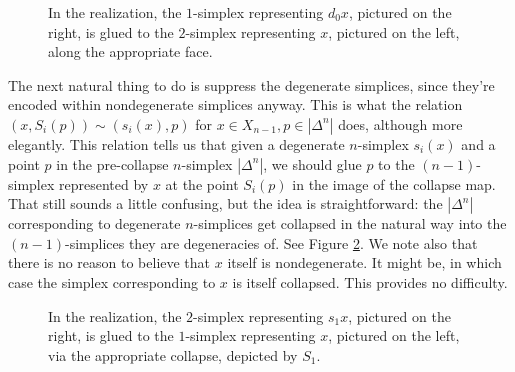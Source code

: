 \documentclass[12pt]{article}
\theoremstyle{plain}
\theoremstyle{definition}
\begin{document}
\begin{figure}[!htp]
\begin{center}
\end{center}
\caption{In the realization, the $1$-simplex representing $d_0x$, pictured on the right, is glued to the $2$-simplex representing $x$, pictured on the left, along the appropriate face.}\label{F: fig13}
\end{figure}

The next natural thing to do is suppress the degenerate simplices, since they're encoded within nondegenerate simplices anyway. This is what the relation $(x,S_i(p))\sim(s_i(x),p)$ for $x\in X_{n-1},p\in |\Delta^n|$ does, although more elegantly. This relation tells us that given a degenerate $n$-simplex $s_i(x)$ and a point $p$ in the pre-collapse $n$-simplex $|\Delta^n|$, we should glue $p$ to the $(n-1)$-simplex represented by $x$ at the point $S_i(p)$ in the image of the collapse map. That still sounds a little confusing, but the idea is straightforward: the $|\Delta^n|$ corresponding to degenerate $n$-simplices get collapsed in the natural way into the $(n-1)$-simplices they are degeneracies of. See Figure \ref{F: fig14}. We note also that there is no reason to believe that $x$ itself is nondegenerate. It might be, in which case the simplex corresponding to $x$ is itself collapsed. This provides no difficulty.



\begin{figure}[!htp]
\begin{center}
\end{center}
\caption{In the realization, the $2$-simplex representing $s_1x$, pictured on the right, is glued to the $1$-simplex representing $x$, pictured on the left, via the appropriate collapse, depicted by $S_1$.}\label{F: fig14}
\end{figure}
\end{document}
